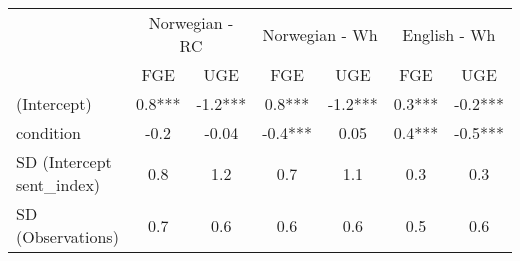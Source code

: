 \begin{longtable}{lcccccc}
\toprule
 & \multicolumn{2}{c}{Norwegian - RC} & \multicolumn{2}{c}{Norwegian - Wh} & \multicolumn{2}{c}{English - Wh} \\ 
\cmidrule(lr){2-3} \cmidrule(lr){4-5} \cmidrule(lr){6-7}
  & FGE & UGE & FGE & UGE & FGE & UGE \\ 
\midrule\addlinespace[2.5pt]
(Intercept) & 0.8*** & -1.2*** & 0.8*** & -1.2*** & 0.3*** & -0.2*** \\ 
condition & -0.2 & -0.04 & -0.4*** & 0.05 & 0.4*** & -0.5*** \\ 
SD (Intercept sent\_index) & 0.8 & 1.2 & 0.7 & 1.1 & 0.3 & 0.3 \\ 
SD (Observations) & 0.7 & 0.6 & 0.6 & 0.6 & 0.5 & 0.6 \\ 
\bottomrule
\end{longtable}

